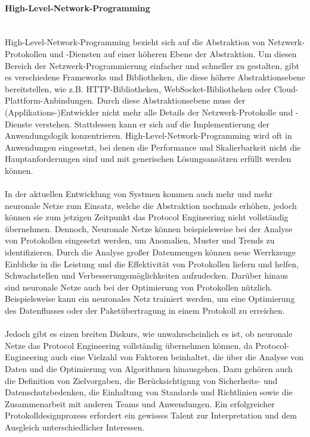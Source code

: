 \documentclass[../vs-script-first-v01.tex]{subfiles}
\begin{document}
\paragraph{High-Level-Network-Programming}\mbox{}\\
High-Level-Network-Programming bezieht sich auf die Abstraktion von Netzwerk-Protokollen und -Diensten auf einer höheren Ebene der Abstraktion. Um diesen Bereich der Netzwerk-Programmierung einfacher und schneller zu gestalten, gibt es verschiedene Frameworks und Bibliotheken, die diese höhere Abstraktionsebene bereitstellen, wie z.B. HTTP-Bibliotheken, WebSocket-Bibliotheken oder Cloud-Plattform-Anbindungen. Durch diese Abstraktionsebene muss der (Applikations-)Entwickler nicht mehr alle Details der Netzwerk-Protokolle und -Dienste verstehen. Stattdessen kann er sich auf die Implementierung der Anwendungslogik konzentrieren. High-Level-Network-Programming wird oft in Anwendungen eingesetzt, bei denen die Performance und Skalierbarkeit nicht die Hauptanforderungen sind und mit generischen Lösungsansätzen erfüllt werden können.  
\\\\
In der aktuellen Entwicklung von Systmen kommen auch mehr und mehr neuronale Netze zum Einsatz, welche die Abstraktion nochmals erhöhen, jedoch können sie zum jetzigen Zeitpunkt das Protocol Engineering nicht vollständig übernehmen. Dennoch, Neuronale Netze können beispielsweise bei der Analyse von Protokollen eingesetzt werden, um Anomalien, Muster und Trends zu identifizieren. Durch die Analyse großer Datenmengen können neue Werrkzeuge Einblicke in die Leistung und die Effektivität von Protokollen liefern und helfen, Schwachstellen und Verbesserungsmöglichkeiten aufzudecken. Darüber hinaus sind neuronale Netze auch bei der Optimierung von Protokollen nützlich. Beispielsweise kann ein neuronales Netz trainiert werden, um eine Optimierung des Datenflusses oder der Paketübertragung in einem Protokoll zu erreichen.
\\\\
Jedoch gibt es einen breiten Diskurs, wie unwahrscheinlich es ist, ob neuronale Netze das Protocol Engineering vollständig übernehmen können, da Protocol-Engineering auch eine Vielzahl von Faktoren beinhaltet, die über die Analyse von Daten und die Optimierung von Algorithmen hinausgehen. Dazu gehören auch die Definition von Zielvorgaben, die Berücksichtigung von Sicherheits- und Datenschutzbedenken, die Einhaltung von Standards und Richtlinien sowie die Zusammenarbeit mit anderen Teams und Anwendungen. Ein erfolgreicher Protokolldesignprozess erfordert ein gewisses Talent zur Interpretation und dem Ausgleich unterschiedlicher Interessen.
\end{document}
